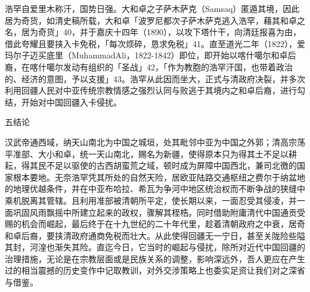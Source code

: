 浩罕自爱里木称汗，国势日强。大和卓之子萨木萨克（Samsaq）匿遁其境，因此居为奇货，如清史稿所载，大和卓「波罗尼都次子萨木萨克逃入浩罕，藉其和卓之名，居为奇货」40，并于嘉庆十四年（1890），以攻下塔什干，向清廷报喜为由，借此夸耀且要挟入卡免税，「每次烦碎，恳求免税」41。直至道光二年（1822），爱玛尔子迈买底里（MuhammadAli，1822-1842）即位，即开始以喀什噶尔和卓后裔，在喀什噶尔发动有组织的「圣战」42，「作为教胞的浩罕汗国，也带着政治的、经济的意图，予以支援」43。浩罕从此因而坐大，正式与清政府决裂，并多次利用回疆人民对中亚传统宗教情感之强烈认同与败逃于其境内之和卓后裔，进行勾结，开始对中国回疆入卡侵扰。

\vfill
\begin{BookNotes}
\end{BookNotes}

五结论

汉武帝通西域，纳天山南北为中国之城垣，处其毗邻中亚为中国之外郭；清高宗荡平准部、大小和卓，统一天山南北，赐名为新疆，使得原本只为得其土不足以耕耘，得其民不足以驱使的古西胡蛮荒之域，顿时成为屏障中国西北，兼司北徼的国家根本要地。无奈浩罕凭其所处的自然天险，居欧亚陆路交通枢纽之费尔于纳盆地的地理优越条件，并在中亚布哈拉、希瓦为争河中地区统治权而不断争战的狭缝中乘机脱离其管辖。且利用准部被清朝所平定，使长期以来，一面忍受其侵凌，并一面巩固风雨飘摇中所建立起来的政权，骤解其桎梏。同时借助附庸清代中国通贡受赐的机会而崛起，最后终于在十九世纪的二十年代里，趁着清朝政府之中衰，居奇和卓后裔，要挟清政府通商免税而壮大。从此使得回疆无一宁日，甚至关陇险些隘其封，河湟也渐失其险。直迄今日，它当时的崛起与侵扰，除所对近代中国回疆的治理措施，无论是在宗教层面或是民族关系的调整，影响深远外，吾人更应在产生过的相当震撼的历史变作中记取教训，对外交涉策略上也委实足资让我们对之深省与借鉴。




